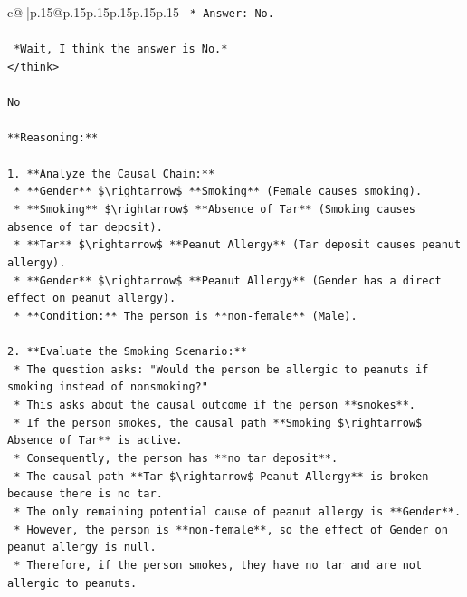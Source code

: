 \documentclass{article}
\begin{document}
{\begin{supertabular}{c@{$\;$}|p{.15\linewidth}@{}p{.15\linewidth}p{.15\linewidth}p{.15\linewidth}p{.15\linewidth}p{.15\linewidth}}
{{{\texttt{    *   Answer: No.} \\
\\ 
\texttt{    *Wait, I think the answer is No.*} \\
\texttt{</think>} \\
\\ 
\texttt{No} \\
\\ 
\texttt{**Reasoning:**} \\
\\ 
\texttt{1.  **Analyze the Causal Chain:**} \\
\texttt{    *   **Gender** \$\textbackslash{}rightarrow\$ **Smoking** (Female causes smoking).} \\
\texttt{    *   **Smoking** \$\textbackslash{}rightarrow\$ **Absence of Tar** (Smoking causes absence of tar deposit).} \\
\texttt{    *   **Tar** \$\textbackslash{}rightarrow\$ **Peanut Allergy** (Tar deposit causes peanut allergy).} \\
\texttt{    *   **Gender** \$\textbackslash{}rightarrow\$ **Peanut Allergy** (Gender has a direct effect on peanut allergy).} \\
\texttt{    *   **Condition:** The person is **non{-}female** (Male).} \\
\\ 
\texttt{2.  **Evaluate the Smoking Scenario:**} \\
\texttt{    *   The question asks: "Would the person be allergic to peanuts if smoking instead of nonsmoking?"} \\
\texttt{    *   This asks about the causal outcome if the person **smokes**.} \\
\texttt{    *   If the person smokes, the causal path **Smoking \$\textbackslash{}rightarrow\$ Absence of Tar** is active.} \\
\texttt{    *   Consequently, the person has **no tar deposit**.} \\
\texttt{    *   The causal path **Tar \$\textbackslash{}rightarrow\$ Peanut Allergy** is broken because there is no tar.} \\
\texttt{    *   The only remaining potential cause of peanut allergy is **Gender**.} \\
\texttt{    *   However, the person is **non{-}female**, so the effect of Gender on peanut allergy is null.} \\
\texttt{    *   Therefore, if the person smokes, they have no tar and are not allergic to peanuts.} \\
}}}
\end{supertabular}}
\end{document}

